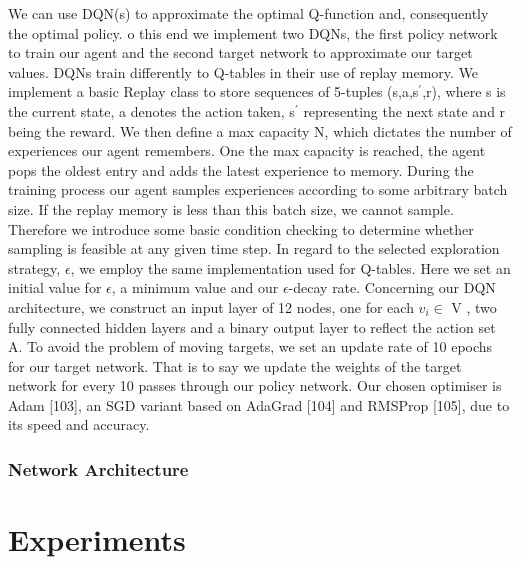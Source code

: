 \documentclass[runningheads]{llncs}
\begin{document}
We can use
DQN(s) to approximate the optimal Q-function and, consequently the optimal policy. o this end we implement two DQNs, the first policy network to train our agent
and the second target network to approximate our target values. DQNs train differently
to Q-tables in their use of replay memory. We implement a basic Replay class to store
sequences of 5-tuples (s,a,s$^{\prime}$,r), where s is the current state, a denotes the action taken,
s$^{\prime}$ representing the next state and r being the reward. We then define a max capacity N,
which dictates the number of experiences our agent remembers. One the max capacity
is reached, the agent pops the oldest entry and adds the latest experience to memory.
During the training process our agent samples experiences according to some arbitrary
batch size. If the replay memory is less than this batch size, we cannot sample. Therefore
we introduce some basic condition checking to determine whether sampling is feasible at
any given time step. In regard to the selected exploration strategy, $\epsilon$, we employ the same
implementation used for Q-tables. Here we set an initial value for $\epsilon$, a minimum value
and our $\epsilon$-decay rate. Concerning our DQN architecture, we construct an input layer of 12
nodes, one for each $v_{i} \in$ V , two fully connected hidden layers and a binary output layer to
reflect the action set A. To avoid the problem of moving targets, we set an update rate of 10
epochs for our target network. That is to say we update the weights of the target network for every 10 passes through our policy network. Our chosen optimiser is Adam [103], an
SGD variant based on AdaGrad [104] and RMSProp [105], due to its speed and accuracy.
\subsubsection{Network Architecture}

\section{Experiments}
\end{document}
